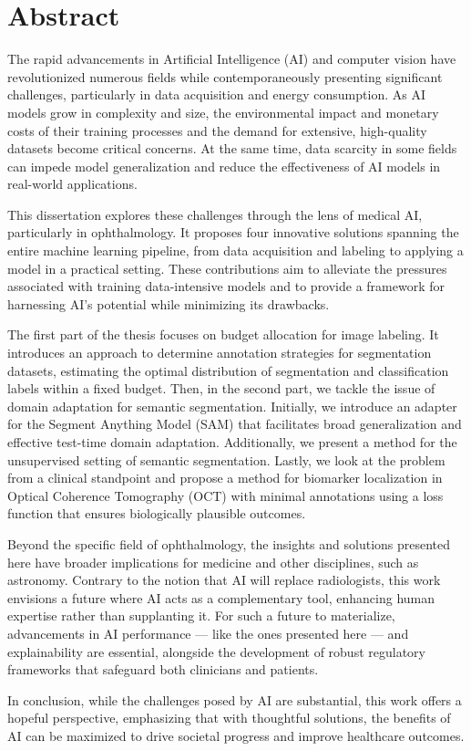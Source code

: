 \chapter*{Abstract}
The rapid advancements in Artificial Intelligence (AI) and computer vision have revolutionized numerous fields while contemporaneously presenting significant challenges, particularly in data acquisition and energy consumption. As AI models grow in complexity and size, the environmental impact and monetary costs of their training processes and the demand for extensive, high-quality datasets become critical concerns. At the same time, data scarcity in some fields can impede model generalization and reduce the effectiveness of AI models in real-world applications. 

This dissertation explores these challenges through the lens of medical AI, particularly in ophthalmology. It proposes four innovative solutions spanning the entire machine learning pipeline, from data acquisition and labeling to applying a model in a practical setting. These contributions aim to alleviate the pressures associated with training data-intensive models and to provide a framework for harnessing AI's potential while minimizing its drawbacks.

The first part of the thesis focuses on budget allocation for image labeling. It introduces an approach to determine annotation strategies for segmentation datasets, estimating the optimal distribution of segmentation and classification labels within a fixed budget. Then, in the second part, we tackle the issue of domain adaptation for semantic segmentation. Initially, we introduce an adapter for the Segment Anything Model (SAM) that facilitates broad generalization and effective test-time domain adaptation. Additionally, we present a method for the unsupervised setting of semantic segmentation. Lastly, we look at the problem from a clinical standpoint and propose a method for biomarker localization in Optical Coherence Tomography (OCT) with minimal annotations using a loss function that ensures biologically plausible outcomes.

Beyond the specific field of ophthalmology, the insights and solutions presented here have broader implications for medicine and other disciplines, such as astronomy. Contrary to the notion that AI will replace radiologists, this work envisions a future where AI acts as a complementary tool, enhancing human expertise rather than supplanting it. For such a future to materialize, advancements in AI performance --- like the ones presented here --- and explainability are essential, alongside the development of robust regulatory frameworks that safeguard both clinicians and patients.

In conclusion, while the challenges posed by AI are substantial, this work offers a hopeful perspective, emphasizing that with thoughtful solutions, the benefits of AI can be maximized to drive societal progress and improve healthcare outcomes.

